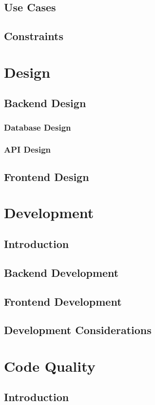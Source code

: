 \documentclass[a4paper,11pt]{article}
\begin{document}
\subsection{Use Cases}
\subsection{Constraints}

\section{Design}
\subsection{Backend Design}
\subsubsection{Database Design}
\subsubsection{API Design}
\subsection{Frontend Design}

\section{Development}
\subsection{Introduction}
\subsection{Backend Development}
\subsection{Frontend Development}
\subsection{Development Considerations}

\section{Code Quality}
\subsection{Introduction}
\end{document}
